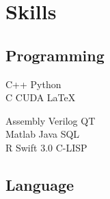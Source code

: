 \documentclass[letterpaper]{deedy-resume} %
\begin{document}
\begin{minipage}[t]{0.33\textwidth}

\section{Skills}

\sectionspace %

\subsection{Programming}
C++ \textbullet{} Python\\
C \textbullet{} CUDA \textbullet{} LaTeX
\sectionspace %

Assembly \textbullet{} Verilog \textbullet{} QT \\

\sectionspace %
Matlab \textbullet{} Java \textbullet{} SQL \\
R \textbullet{} Swift 3.0 \textbullet{} C-LISP \\ 

\sectionspace %
\sectionspace %

\subsection{Language}

\sectionspace %



\end{minipage} %
\hfill
%
%
\end{document}
